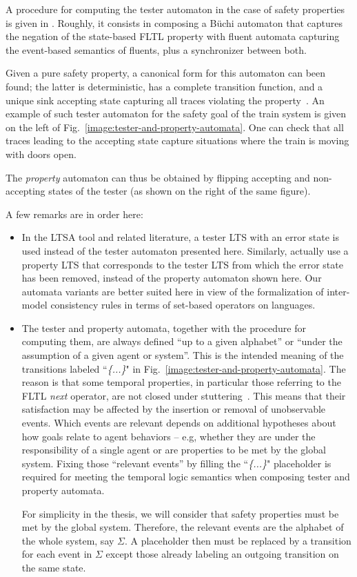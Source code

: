 A procedure for computing the tester automaton in the case of safety properties is given in \cite{Giannakopoulou:2003}. Roughly, it consists in composing a B\"uchi automaton that captures the negation of the state-based FLTL property with fluent automata capturing the event-based semantics of fluents, plus a synchronizer between both. 

Given a pure safety property, a canonical form for this automaton can been found; the latter is deterministic, has a complete transition function, and a unique sink accepting state capturing all traces violating the property~\cite{Giannakopoulou:2003}. An example of such tester automaton for the safety goal of the train system is given on the left of Fig.~\ref{image:tester-and-property-automata}. One can check that all traces leading to the accepting state capture situations where the train is moving with doors open. 

The \emph{property} automaton can thus be obtained by flipping accepting and non-accepting states of the tester (as shown on the right of the same figure). 

A few remarks are in order here:

\begin{itemize}

\item In the LTSA tool \cite{Magee:1999} and related literature, a tester LTS with an error state is used instead of the tester automaton presented here. Similarly, \cite{Letier:2005, Letier:2008} actually use a property LTS that corresponds to the tester LTS from which the error state has been removed, instead of the property automaton shown here. Our automata variants are better suited here in view of the formalization of inter-model consistency rules in terms of set-based operators on languages. 

\item The tester and property automata, together with the procedure for computing them, are always defined ``up to a given alphabet'' or ``under the assumption of a given agent or system''. This is the intended meaning of the transitions labeled ``\emph{\{...\}}" in Fig.~\ref{image:tester-and-property-automata}. The reason is that some temporal properties, in particular those referring to the FLTL \emph{next} operator, are not closed under stuttering~\cite{Lamport:1994}. This means that their satisfaction may be affected by the insertion or removal of unobservable events. Which events are relevant depends on additional hypotheses about how goals relate to agent behaviors -- e.g, whether they are under the responsibility of a single agent or are properties to be met by the global system. Fixing those ``relevant events'' by filling the ``\emph{\{...\}}" placeholder is required for meeting the temporal logic semantics when composing tester and property automata. 

For simplicity in the thesis, we will consider that safety properties must be met by the global system. Therefore, the relevant events are the alphabet of the whole system, say $\Sigma$. A placeholder then must be replaced by a transition for each event in $\Sigma$ except those already labeling an outgoing transition on the same state.

\end{itemize}

